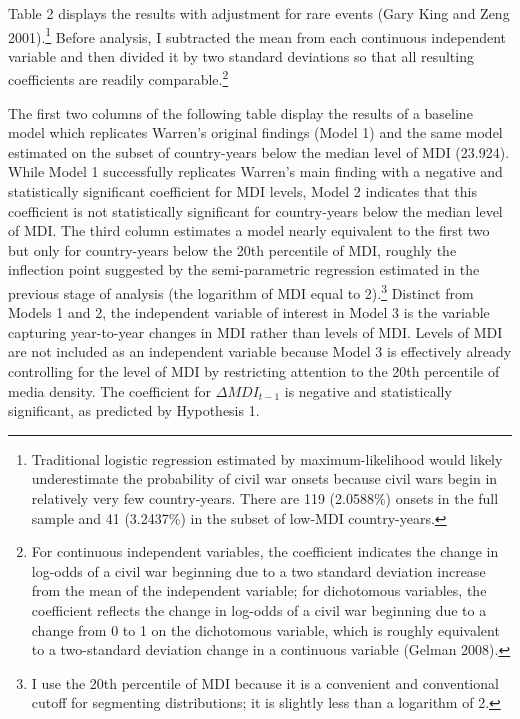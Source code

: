 \documentclass[11pt,article,oneside]{memoir}
\begin{document}
Table 2 displays the results with adjustment for rare events (Gary King
and Zeng 2001).\footnote{Traditional logistic regression estimated by
  maximum-likelihood would likely underestimate the probability of civil
  war onsets because civil wars begin in relatively very few
  country-years. There are 119 (2.0588\%) onsets in the full sample and
  41 (3.2437\%) in the subset of low-MDI country-years.} Before
analysis, I subtracted the mean from each continuous independent
variable and then divided it by two standard deviations so that all
resulting coefficients are readily comparable.\footnote{For continuous
  independent variables, the coefficient indicates the change in
  log-odds of a civil war beginning due to a two standard deviation
  increase from the mean of the independent variable; for dichotomous
  variables, the coefficient reflects the change in log-odds of a civil
  war beginning due to a change from 0 to 1 on the dichotomous variable,
  which is roughly equivalent to a two-standard deviation change in a
  continuous variable (Gelman 2008).}

The first two columns of the following table display the results of a
baseline model which replicates Warren's original findings (Model 1) and
the same model estimated on the subset of country-years below the median
level of MDI (23.924). While Model 1 successfully replicates Warren's
main finding with a negative and statistically significant coefficient
for MDI levels, Model 2 indicates that this coefficient is not
statistically significant for country-years below the median level of
MDI. The third column estimates a model nearly equivalent to the first
two but only for country-years below the 20th percentile of MDI, roughly
the inflection point suggested by the semi-parametric regression
estimated in the previous stage of analysis (the logarithm of MDI equal
to 2).\footnote{I use the 20th percentile of MDI because it is a
  convenient and conventional cutoff for segmenting distributions; it is
  slightly less than a logarithm of 2.} Distinct from Models 1 and 2,
the independent variable of interest in Model 3 is the variable
capturing year-to-year changes in MDI rather than levels of MDI. Levels
of MDI are not included as an independent variable because Model 3 is
effectively already controlling for the level of MDI by restricting
attention to the 20th percentile of media density. The coefficient for
$\Delta$$MDI_{t-1}$ is negative and statistically significant, as
predicted by Hypothesis 1.
\end{document}
